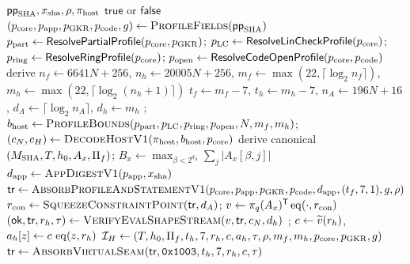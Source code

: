 \begin{algorithm}[H]
\caption{SHA front-end verifier and virtual-PCS handoff}
\label{alg:sha-verifier}
\scriptsize
\begin{algorithmic}[1]
\Require $\mathsf{pp}_{\rm SHA},x_{\rm sha},\rho,\pi_{\rm host}$
\Ensure $\mathsf{true}$ or $\mathsf{false}$
\State $(p_{\rm core},p_{\rm app},p_{\rm GKR},p_{\rm code},g)
  \gets\Call{ProfileFields}{\mathsf{pp}_{\rm SHA}}$
\State {}
\State $p_{\rm part}\gets\mathsf{ResolvePartialProfile}(p_{\rm core},p_{\rm GKR})$;
  $p_{\rm LC}\gets\mathsf{ResolveLinCheckProfile}(p_{\rm core})$;
  $p_{\rm ring}\gets\mathsf{ResolveRingProfile}(p_{\rm core})$;
  $p_{\rm open}\gets\mathsf{ResolveCodeOpenProfile}(p_{\rm core},p_{\rm code})$
\State \label{ln:sha-no-virtual-profile}
\State derive $n_f\gets6641N+256$, $n_h\gets20005N+256$,
  $m_f\gets\max(22,\lceil\log_2n_f\rceil)$,
  $m_h\gets\max(22,\lceil\log_2(n_h+1)\rceil)$
\State $t_f\gets m_f-7$, $t_h\gets m_h-7$,
  $n_A\gets196N+16$, $d_A\gets\lceil\log_2n_A\rceil$, $d_h\gets m_h$
\State {};
  $b_{\rm host}\gets\Call{ProfileBounds}{p_{\rm part},p_{\rm LC},p_{\rm ring},p_{\rm open},
    N,m_f,m_h}$; 
\State $(c_N,c_H)\gets\Call{DecodeHostV1}{
  \pi_{\rm host},b_{\rm host},p_{\rm core}}$
\State derive canonical $(M_{\rm SHA},T,h_0,A_x,\Pi_f)$;
  $B_x\gets\max_{\beta<2^{d_A}}\sum_j|A_x[\beta,j]|$
\State {}
\State {}
\State $d_{\rm app}\gets\Call{AppDigestV1}{p_{\rm app},x_{\rm sha}}$
\State $\Tr\gets\Call{AbsorbProfileAndStatementV1}{
  p_{\rm core},p_{\rm app},p_{\rm GKR},p_{\rm code},d_{\rm app},
  (t_f,7,1),g,\rho}$
\State $r_{\rm con}\gets\Call{SqueezeConstraintPoint}{\Tr,d_A}$;
  $v\gets\pi_q(A_x)^{\mathsf T}\operatorname{eq}(\cdot,r_{\rm con})$
\State $(\mathsf{ok},\Tr,r_h,\tau)\gets
  \Call{VerifyEvalShapeStream}{v,\Tr,c_N,d_h}$
\State {};
  $c\gets\widetilde{v}(r_h)$, $a_h[z]\gets c\,\operatorname{eq}(z,r_h)$
\State $\mathcal I_H\gets(T,h_0,\Pi_f,t_h,7,r_h,c,a_h,\tau,\rho,
  m_f,m_h,p_{\rm core},p_{\rm GKR},g)$
\State {}
\State $\Tr\gets\Call{AbsorbVirtualSeam}{\Tr,\mathtt{0x1003},
  t_h,7,r_h,c,\tau}$

\end{algorithmic}
\end{algorithm}
